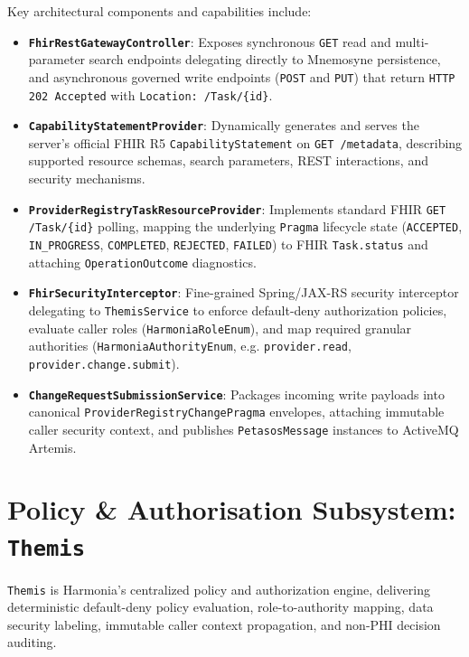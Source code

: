 Key architectural components and capabilities include:
\begin{itemize}
    \item \textbf{\texttt{FhirRestGatewayController}}: Exposes synchronous \texttt{GET} read and multi-parameter search endpoints delegating directly to Mnemosyne persistence, and asynchronous governed write endpoints (\texttt{POST} and \texttt{PUT}) that return \texttt{HTTP 202 Accepted} with \texttt{Location: /Task/\{id\}}.
    \item \textbf{\texttt{CapabilityStatementProvider}}: Dynamically generates and serves the server's official FHIR R5 \texttt{CapabilityStatement} on \texttt{GET /metadata}, describing supported resource schemas, search parameters, REST interactions, and security mechanisms.
    \item \textbf{\texttt{ProviderRegistryTaskResourceProvider}}: Implements standard FHIR \texttt{GET /Task/\{id\}} polling, mapping the underlying \texttt{Pragma} lifecycle state (\texttt{ACCEPTED}, \texttt{IN\_PROGRESS}, \texttt{COMPLETED}, \texttt{REJECTED}, \texttt{FAILED}) to FHIR \texttt{Task.status} and attaching \texttt{OperationOutcome} diagnostics.
    \item \textbf{\texttt{FhirSecurityInterceptor}}: Fine-grained Spring/JAX-RS security interceptor delegating to \texttt{ThemisService} to enforce default-deny authorization policies, evaluate caller roles (\texttt{HarmoniaRoleEnum}), and map required granular authorities (\texttt{HarmoniaAuthorityEnum}, e.g. \texttt{provider.read}, \texttt{provider.change.submit}).
    \item \textbf{\texttt{ChangeRequestSubmissionService}}: Packages incoming write payloads into canonical \texttt{ProviderRegistryChangePragma} envelopes, attaching immutable caller security context, and publishes \texttt{PetasosMessage} instances to ActiveMQ Artemis.
\end{itemize}

\section{Policy \& Authorisation Subsystem: \texttt{Themis}}
\label{sec:themis_subsystem}

\texttt{Themis} is Harmonia's centralized policy and authorization engine, delivering deterministic default-deny policy evaluation, role-to-authority mapping, data security labeling, immutable caller context propagation, and non-PHI decision auditing.

